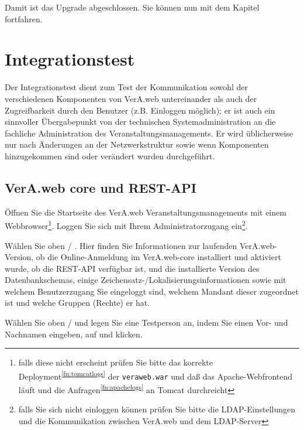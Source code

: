 \documentclass{tarentanleitung}
\begin{document}
Damit ist das Upgrade abgeschlossen.
Sie können nun mit dem Kapitel  fortfahren.

\section{Integrationstest}\label{sec:test}

Der Integrationstest dient zum Test der Kommunikation sowohl der
verschiedenen Komponenten von VerA.web untereinander als auch der
Zugreifbarkeit durch den Benutzer (z.B. Einloggen möglich); er ist auch
ein sinnvoller Übergabepunkt von der technischen Systemadministration
an die fachliche Administration des Veranstaltungsmanagements. Er wird
üblicherweise nur nach Änderungen an der Netzwerkstruktur sowie wenn
Komponenten hinzugekommen sind oder verändert wurden durchgeführt.

\subsection{VerA.web core und REST-API}

Öffnen Sie die Startseite des VerA.web Veranstaltungsmanagements mit
einem Webbrowser\Hair\footnote{falls diese nicht erscheint prüfen Sie
bitte das korrekte Deployment\Hair\textsuperscript{\ref{fn:tomcatlogs}}
der \texttt{veraweb.war} und daß das Apache-Webfrontend läuft und die
Anfragen\Hair\textsuperscript{\ref{fn:apachelogs}} an Tomcat durchreicht}.
Loggen Sie sich mit Ihrem Administratorzugang ein\Hair\footnote{falls
Sie sich nicht einloggen können prüfen Sie bitte die LDAP-Einstellungen
und die Kommunikation zwischen VerA.web und dem LDAP-Server}.

%

Wählen Sie oben  / . Hier
finden Sie Informationen zur laufenden VerA.web-Version, ob die
Online-Anmeldung im VerA.web-core installiert und aktiviert wurde,
ob die REST-API verfügbar ist, und die installierte Version des
Datenbankschemas, einige Zeichensatz-/Lokalisierungsinformationen sowie
mit welchem Benutzerzugang Sie eingeloggt sind, %
welchem Mandant dieser zugeordnet ist und welche
Gruppen (Rechte) er hat.

Wählen Sie oben  / 
und legen Sie eine Testperson an, indem Sie einen Vor- und Nachnamen
eingeben, auf  und
 klicken.\strut
\end{document}
